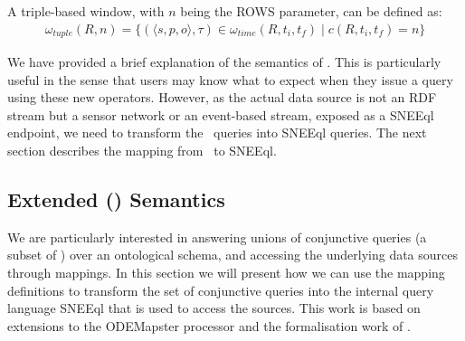 A triple-based window, with $n$ being the \textsf{ROWS} parameter, can be defined as:
\begin{align*}
\omega_{tuple}(R,n)=\{(\langle s,p,o \rangle,\tau) \in \omega_{time}(R,t_{i},t_{f}) \mid c(R,t_{i},t_{f})=n \}
\end{align*}

We have provided a brief explanation of the semantics of \sparqlstr. This is particularly useful in the sense that users may know what to expect when they issue a query using these new operators. However, as the actual data source is not an RDF stream but a sensor network or an event-based stream, exposed as a SNEEql endpoint, we need to transform the \sparqlstr\ queries into SNEEql queries.
The next section describes the mapping from \sparqlstr\ to SNEEql.




\subsection{Extended \rtwoo (\stwoo) Semantics}
\label{mappingsemantics}

We are particularly interested in answering unions of conjunctive queries (a subset of \sparqlstr) over an ontological
schema, and accessing the underlying data sources through mappings. In this section we will present how we can use the
mapping definitions to transform the set of conjunctive queries into the internal query language SNEEql that is used to
access the sources. This work is based on extensions to the ODEMapster processor \cite{Barrasa_04} and the
formalisation work of \cite{Calvanese_05,Poggi_08}.

